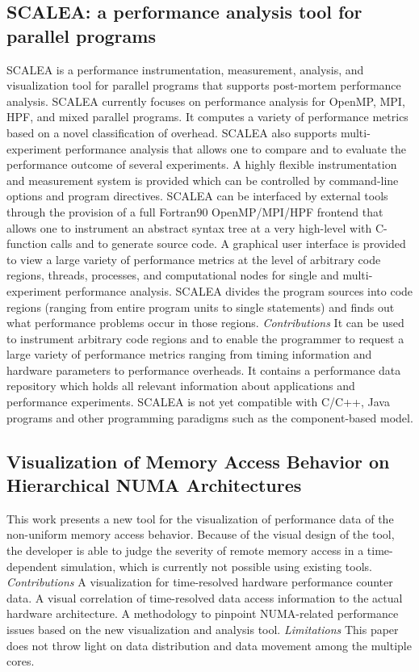 \subsection{SCALEA: a performance analysis tool for parallel programs}
SCALEA is a performance instrumentation, measurement, analysis, and visualization tool for parallel programs that supports post-mortem performance analysis. SCALEA currently focuses on performance analysis for OpenMP, MPI, HPF, and mixed parallel programs. It computes a variety of performance metrics based on a novel classification of overhead. SCALEA also supports multi-experiment performance analysis that allows one to compare and to evaluate the performance outcome of several experiments. A highly flexible instrumentation and measurement system is provided which can be controlled by command-line options and program directives. SCALEA can be interfaced by external tools through the provision of a full Fortran90 OpenMP/MPI/HPF frontend that allows one to instrument an abstract syntax tree at a very high-level with C-function calls and to generate source code. A graphical user interface is provided to view a large variety of performance metrics at the level of arbitrary code regions, threads, processes, and computational nodes for single and multi-experiment performance analysis. SCALEA divides the program sources into code regions (ranging from entire program units to single statements) and finds out what performance problems occur in those regions.\newline
\textit{Contributions}\newline
It can be used to instrument arbitrary code regions and to enable the programmer to request a large variety of performance metrics ranging from timing information and hardware parameters to performance overheads.
It contains a performance data repository which holds all relevant information about applications and performance experiments.
SCALEA is not yet compatible with C/C++, Java programs and other programming paradigms such as the component-based model.

\subsection{Visualization of Memory Access Behavior on Hierarchical NUMA Architectures}
This work presents a new tool for the visualization of performance data of the non-uniform memory access behavior. Because of the visual design of the tool, the developer is able to judge the severity of remote memory access in a time-dependent simulation, which is currently not possible using existing tools.\newline
\textit{Contributions}\newline
A visualization for time-resolved hardware performance counter data.
A visual correlation of time-resolved data access information to the actual hardware architecture.
A methodology to pinpoint NUMA-related performance issues based on the new visualization and analysis tool.\newline
\textit{Limitations}\newline
This paper does not throw light on data distribution and data movement among the multiple cores.
